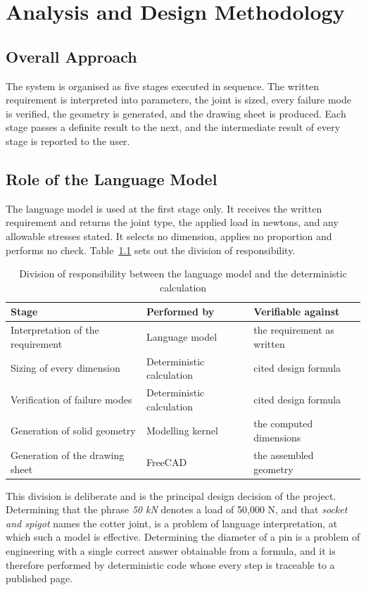 \chapter{Analysis and Design Methodology}

\section{Overall Approach}
The system is organised as five stages executed in sequence. The written requirement is interpreted into parameters, the joint is sized, every failure mode is verified, the geometry is generated, and the drawing sheet is produced. Each stage passes a definite result to the next, and the intermediate result of every stage is reported to the user.

\section{Role of the Language Model}
The language model is used at the first stage only. It receives the written requirement and returns the joint type, the applied load in newtons, and any allowable stresses stated. It selects no dimension, applies no proportion and performs no check. Table~\ref{tab:roles} sets out the division of responsibility.

\begin{table}[htbp]
\centering
\caption{Division of responsibility between the language model and the deterministic calculation}
\label{tab:roles}
\small
\begin{tabularx}{\textwidth}{@{}lll@{}}
\toprule
Stage & Performed by & Verifiable against \\
\midrule
Interpretation of the requirement & Language model & the requirement as written \\
Sizing of every dimension & Deterministic calculation & cited design formula \\
Verification of failure modes & Deterministic calculation & cited design formula \\
Generation of solid geometry & Modelling kernel & the computed dimensions \\
Generation of the drawing sheet & FreeCAD & the assembled geometry \\
\bottomrule
\end{tabularx}
\end{table}

This division is deliberate and is the principal design decision of the project. Determining that the phrase \emph{50 kN} denotes a load of 50,000 N, and that \emph{socket and spigot} names the cotter joint, is a problem of language interpretation, at which such a model is effective. Determining the diameter of a pin is a problem of engineering with a single correct answer obtainable from a formula, and it is therefore performed by deterministic code whose every step is traceable to a published page.

